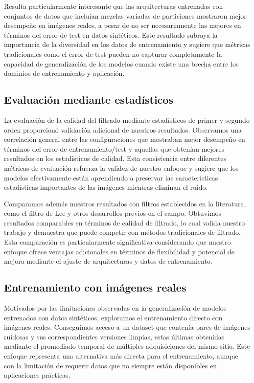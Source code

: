 Resulta particularmente interesante que las arquitecturas entrenadas con conjuntos de datos que incluían mezclas variadas de particiones mostraron mejor desempeño en imágenes reales, a pesar de no ser necesariamente las mejores en términos del error de test en datos sintéticos. Este resultado subraya la importancia de la diversidad en los datos de entrenamiento y sugiere que métricas tradicionales como el error de test pueden no capturar completamente la capacidad de generalización de los modelos cuando existe una brecha entre los dominios de entrenamiento y aplicación.

\subsection{Evaluación mediante estadísticos}

La evaluación de la calidad del filtrado mediante estadísticos de primer y segundo orden proporcionó validación adicional de nuestros resultados. Observamos una correlación general entre las configuraciones que mostraban mejor desempeño en términos del error de entrenamiento/test y aquellas que obtenían mejores resultados en los estadísticos de calidad. Esta consistencia entre diferentes métricas de evaluación refuerza la validez de nuestro enfoque y sugiere que los modelos efectivamente están aprendiendo a preservar las características estadísticas importantes de las imágenes mientras eliminan el ruido.

Comparamos además nuestros resultados con filtros establecidos en la literatura, como el filtro de Lee y otros desarrollos previos en el campo. Obtuvimos resultados comparables en términos de calidad de filtrado, lo cual valida nuestro trabajo y demuestra que puede competir con métodos tradicionales de filtrado. Esta comparación es particularmente significativa considerando que nuestro enfoque ofrece ventajas adicionales en términos de flexibilidad y potencial de mejora mediante el ajuste de arquitecturas y datos de entrenamiento.

\subsection{Entrenamiento con imágenes reales}

Motivados por las limitaciones observadas en la generalización de modelos entrenados con datos sintéticos, exploramos el entrenamiento directo con imágenes reales. Conseguimos acceso a un dataset que contenía pares de imágenes ruidosas y sus correspondientes versiones limpias, estas últimas obtenidas mediante el promediado temporal de múltiples adquisiciones del mismo sitio. Este enfoque representa una alternativa más directa para el entrenamiento, aunque con la limitación de requerir datos que no siempre están disponibles en aplicaciones prácticas.

